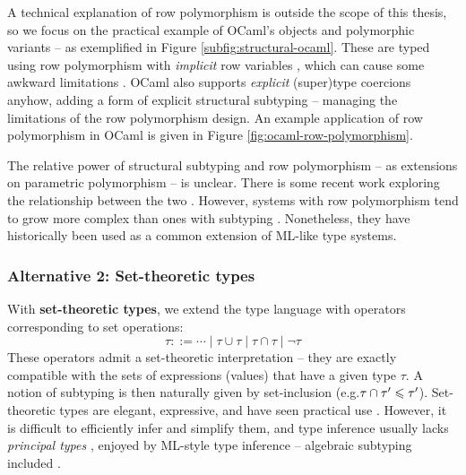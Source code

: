 A technical explanation of row polymorphism is outside the scope of this thesis, so we focus on the practical example of OCaml's objects \cite{objective-ml} and polymorphic variants \cite{polymorphic-variants} -- as exemplified in Figure \ref{subfig:structural-ocaml}. These are typed using row polymorphism with \emph{implicit} row variables \cite{objective-ml}, which can cause some awkward limitations \cite{castagna-polymorphic-variants}. OCaml also supports \emph{explicit} (super)type coercions anyhow, adding a form of explicit structural subtyping -- managing the limitations of the row polymorphism design. 
An example application of row polymorphism in OCaml is given in Figure \ref{fig:ocaml-row-polymorphism}.

The relative power of structural subtyping and row polymorphism -- as extensions on parametric polymorphism -- is unclear.
There is some recent work exploring the relationship between the two \cite{disjoint-polymorphism, structural-subtyping-as-parameric-polymorphism}. However, systems with row polymorphism tend to grow more complex than ones with subtyping \cite{castagna-polymorphic-variants}. Nonetheless, they have historically been used as a common extension of ML-like type systems.

\subsubsection{Alternative 2: Set-theoretic types}

With \textbf{set-theoretic types}, we extend the type language with operators corresponding to set operations:
$$ \tau ::= \cdots \mid \tau \cup \tau \mid \tau \cap \tau \mid \lnot \tau $$
These operators admit a set-theoretic interpretation -- they are exactly compatible with the sets of expressions (values) that have a given type $\tau$. 
A notion of subtyping is then naturally given by set-inclusion (e.g.\@ $\tau \cap \tau' \leqslant \tau'$).
Set-theoretic types are elegant, expressive, and have seen practical use \cite{set-theoretic-types-for-elixir, set-theoretic-types-for-erlang}. However, it is difficult to efficiently infer and simplify them, and type inference usually lacks \emph{principal types} \cite{polymorphic-set-theoretic-types, castagna-polymorphic-variants, castagna-dynamic}, enjoyed by ML-style type inference -- algebraic subtyping included \cite{mlstruct, castagna-dynamic}. 

